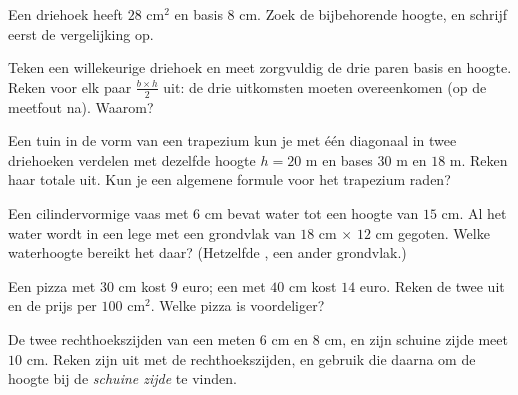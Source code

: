 \begin{exercise}[$\star$]\label{exo:g7:areas:7}
Een driehoek heeft  $28$ cm$^2$ en basis $8$ cm. Zoek de bijbehorende
hoogte, en schrijf eerst de vergelijking op.
\end{exercise}

\begin{exercise}[$\star\star$]\label{exo:g7:areas:8}
Teken een willekeurige driehoek en meet zorgvuldig de drie paren basis en hoogte.
Reken voor elk paar $\frac{b \times h}{2}$ uit: de drie uitkomsten moeten
overeenkomen (op de meetfout na). Waarom?
\end{exercise}

\begin{exercise}[$\star\star$]\label{exo:g7:areas:9}
Een tuin in de vorm van een trapezium kun je met één diagonaal in twee driehoeken
verdelen met dezelfde hoogte $h = 20$ m en bases $30$ m en $18$ m. Reken haar totale
 uit. Kun je een algemene formule voor het trapezium raden?
\end{exercise}

\begin{exercise}[$\star\star$]\label{exo:g7:areas:10}
Een cilindervormige vaas met  $6$ cm bevat water tot een hoogte van $15$ cm. Al
het water wordt in een lege  met een grondvlak van $18$ cm $\times$ $12$ cm
gegoten. Welke waterhoogte bereikt het daar? (Hetzelfde , een ander grondvlak.)
\end{exercise}

\begin{exercise}[$\star\star$]\label{exo:g7:areas:11}
Een pizza met  $30$ cm kost $9$ euro; een met  $40$ cm kost $14$
euro. Reken de twee  uit en de prijs per $100$ cm$^2$. Welke pizza is
voordeliger?
\end{exercise}

\begin{exercise}[$\star\star\star$]\label{exo:g7:areas:12}
De twee rechthoekszijden van een  meten $6$ cm en $8$ cm, en
zijn schuine zijde meet $10$ cm. Reken zijn  uit met de rechthoekszijden,
en gebruik die  daarna om de hoogte bij de \emph{schuine zijde} te vinden.
\end{exercise}

